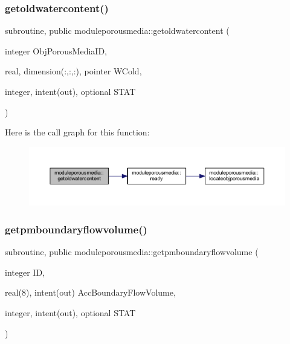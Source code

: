 \subsubsection{\texorpdfstring{getoldwatercontent()}{getoldwatercontent()}}
{\footnotesize\ttfamily subroutine, public moduleporousmedia\+::getoldwatercontent (\begin{DoxyParamCaption}\item[{integer}]{Obj\+Porous\+Media\+ID,  }\item[{real, dimension(\+:,\+:,\+:), pointer}]{W\+Cold,  }\item[{integer, intent(out), optional}]{S\+T\+AT }\end{DoxyParamCaption})}

Here is the call graph for this function\+:\nopagebreak
\begin{figure}[H]
\begin{center}
\leavevmode
\includegraphics[width=350pt]{namespacemoduleporousmedia_a2b7e324655161146b0aaf1af3e684670_cgraph}
\end{center}
\end{figure}
\mbox{\label{namespacemoduleporousmedia_af76c86e60836074eb54ae108e4cbb7e5}} 
\subsubsection{\texorpdfstring{getpmboundaryflowvolume()}{getpmboundaryflowvolume()}}
{\footnotesize\ttfamily subroutine, public moduleporousmedia\+::getpmboundaryflowvolume (\begin{DoxyParamCaption}\item[{integer}]{ID,  }\item[{real(8), intent(out)}]{Acc\+Boundary\+Flow\+Volume,  }\item[{integer, intent(out), optional}]{S\+T\+AT }\end{DoxyParamCaption})}

